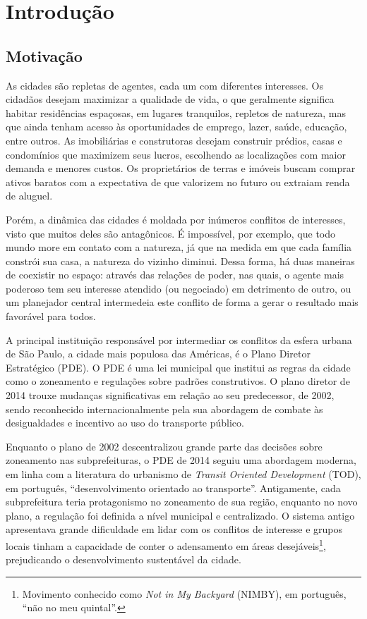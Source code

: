\chapter{Introdução}

\section{Motivação}
\label{sec:motivacao}

As cidades são repletas de agentes, cada um com diferentes interesses. Os cidadãos desejam maximizar a qualidade de vida, o que geralmente significa habitar residências espaçosas, em lugares tranquilos, repletos de natureza, mas que ainda tenham acesso às oportunidades de emprego, lazer, saúde, educação, entre outros. As imobiliárias e construtoras desejam construir prédios, casas e condomínios que maximizem seus lucros, escolhendo as localizações com maior demanda e menores custos. Os proprietários de terras e imóveis buscam comprar ativos baratos com a expectativa de que valorizem no futuro ou extraiam renda de aluguel. 

Porém, a dinâmica das cidades é moldada por inúmeros conflitos de interesses, visto que muitos deles são antagônicos. É impossível, por exemplo, que todo mundo more em contato com a natureza, já que na medida em que cada família constrói sua casa, a natureza do vizinho diminui. Dessa forma, há duas maneiras de coexistir no espaço: através das relações de poder, nas quais, o agente mais poderoso tem seu interesse atendido (ou negociado) em detrimento de outro, ou um planejador central intermedeia este conflito de forma a gerar o resultado mais favorável para todos.

A principal instituição responsável por intermediar os conflitos da esfera urbana de São Paulo, a cidade mais populosa das Américas, é o Plano Diretor Estratégico (PDE). O PDE é uma lei municipal que institui as regras da cidade como o zoneamento e regulações sobre padrões construtivos. O plano diretor de 2014 trouxe mudanças significativas em relação ao seu predecessor, de 2002, sendo reconhecido internacionalmente pela sua abordagem de combate às desigualdades e incentivo ao uso do transporte público.

Enquanto o plano de 2002 descentralizou grande parte das decisões sobre zoneamento nas subprefeituras, o PDE de 2014 seguiu uma abordagem moderna, em linha com a literatura do urbanismo de \textit{Transit Oriented Development} (TOD), em português, ``desenvolvimento orientado ao transporte''. Antigamente, cada subprefeitura teria protagonismo no zoneamento de sua região, enquanto no novo plano, a regulação foi definida a nível municipal e centralizado. O sistema antigo apresentava grande dificuldade em lidar com os conflitos de interesse e grupos locais tinham a capacidade de conter o adensamento em áreas desejáveis\footnote{Movimento conhecido como \textit{Not in My Backyard} (NIMBY), em português, ``não no meu quintal''.}, prejudicando o desenvolvimento sustentável da cidade.


